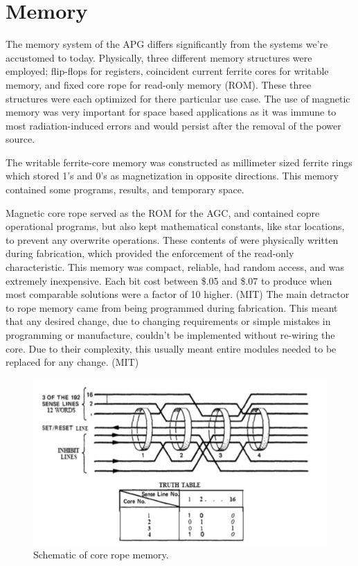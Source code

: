 \documentclass[a4paper,11pt]{article}
\begin{document}

\section{Memory}
The memory system of the APG differs significantly from the systems we're accustomed to today.  Physically, three different memory structures were employed; flip-flops for registers, coincident current ferrite cores for writable memory, and fixed core rope for read-only memory (ROM).  These three structures were each optimized for there particular use case.  The use of magnetic memory was very important for space based applications as it was immune to most radiation-induced errors and would persist after the removal of the power source.

The writable ferrite-core memory was constructed as millimeter sized ferrite rings which stored 1's and 0's as magnetization in opposite directions.  This memory contained some programs, results, and temporary space.  

Magnetic core rope served as the ROM for the AGC, and contained copre operational programs, but also kept mathematical constants, like star locations, to prevent any overwrite operations.  These contents of were physically written during fabrication, which provided the enforcement of the read-only characteristic.  This memory was compact, reliable, had random access, and was extremely inexpensive.  Each bit cost between \$.05 and \$.07 to produce when most comparable solutions were a factor of 10 higher. (MIT) The main detractor to rope memory came from being programmed during fabrication.  This meant that any desired change, due to changing requirements or simple mistakes in programming or manufacture, couldn't be implemented without re-wiring the core.  Due to their complexity, this usually meant entire modules needed to be replaced for any change.  (MIT)

\begin{figure}[h!]
\caption{Schematic of core rope memory.} 
\centering
\includegraphics[width=.8\textwidth]{core_rope.png} 
\end{figure}
\vspace{0.02cm}
\end{document}
